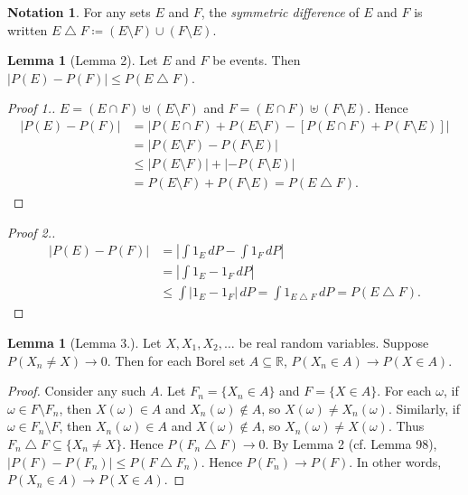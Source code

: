 \documentclass{article}
\newcommand{\R}{\mathbb{R}}
\theoremstyle{definition}
\newtheorem{lemma}[theorem]{Lemma}
\newtheorem*{notation}{Notation}
\begin{document}
\begin{notation}
For any sets $E$ and $F$, the \emph{symmetric difference} of $E$ and $F$ is written $E \bigtriangleup F \coloneqq (E \setminus F) \cup (F \setminus E)$.
\end{notation}
\begin{lemma}[Lemma 2]
    Let $E$ and $F$ be events. Then $|P(E) - P(F)| \leq P(E \bigtriangleup F)$.
\end{lemma}
\begin{proof}[Proof 1.]
$E = (E \cap F) \uplus (E \setminus F)$ and $F = (E \cap F) \uplus (F \setminus E)$. Hence
\begin{align*}
    |P(E) - P(F)| &= |P(E \cap F) + P(E \setminus F) - [P(E \cap F) + P(F \setminus E)]| \\
    &= |P(E \setminus F) - P(F \setminus E)| \\
    &\leq |P(E \setminus F)| + |-P(F \setminus E)| \\
    &= P(E \setminus F) + P(F \setminus E) = P(E \bigtriangleup F).
\end{align*}
\end{proof}
\begin{proof}[Proof 2.]
\begin{align*}
    |P(E) - P(F)| &= \left| \int 1_E \,dP - \int 1_F \,dP \right| \\
        &= \left| \int 1_E - 1_F \,dP \right| \\
        &\leq \int |1_E - 1_F| \,dP = \int 1_{E \bigtriangleup F} \,dP = P(E \bigtriangleup F).
\end{align*}
\end{proof}

\begin{lemma}[Lemma 3.]
    Let $X, X_1, X_2, \dots$ be real random variables. Suppose $P(X_n \neq X) \to 0$. Then for each Borel set $A \subseteq \R$, $P(X_n \in A) \to P(X \in A)$.
\end{lemma}
\begin{proof}
Consider any such $A$. Let $F_n = \{X_n \in A\}$ and $F = \{X \in A\}$. For each $\omega$, if $\omega \in F \setminus F_n$, then $X(\omega) \in A$ and $X_n(\omega) \notin A$, so $X(\omega) \neq X_n(\omega)$. Similarly, if $\omega \in F_n \setminus F$, then $X_n(\omega) \in A$ and $X(\omega) \notin A$, so $X_n(\omega) \neq X(\omega)$. Thus $F_n \bigtriangleup F \subseteq \{X_n \neq X\}$. Hence $P(F_n \bigtriangleup F) \to 0$. By Lemma 2 (cf. Lemma 98), $|P(F) - P(F_n)| \leq P(F \bigtriangleup F_n)$. Hence $P(F_n) \to P(F)$. In other words, $P(X_n \in A) \to P(X \in A)$.
\end{proof}
\end{document}
